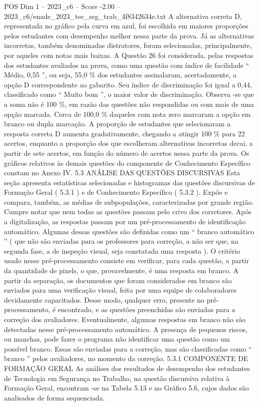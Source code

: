 \begin{textsample}{POS Dim 1 – 2023\_c6 – Score -2.00 – 2023\_c6/enade\_2023\_tec\_seg\_trab\_4f8342634e.txt}
A alternativa correta D, representada no gráfico pela curva em azul, foi escolhida em maiores proporções pelos estudantes com desempenho melhor nessa parte da prova.
Já as alternativas incorretas, também denominadas distratores, foram selecionadas, principalmente, por aqueles com notas mais baixas.
A Questão 26 foi considerada, pelas respostas dos estudantes avaliados na prova, como uma questão com índice de facilidade “ Médio, 0,55 ”, ou seja, 55,0 \% dos estudantes assinalaram, acertadamente, a opção D correspondente ao gabarito.
Seu índice de discriminação foi igual a 0,44, classificado como “ Muito bom ”, o maior valor de discriminação.
Observa -se que a soma não é 100 \%, em razão das questões não respondidas ou com mais de uma opção marcada.
Cerca de 100,0 \% daqueles com nota zero marcaram a opção em branco ou dupla marcação.
A proporção de estudantes que selecionaram a resposta correta D aumenta gradativamente, chegando a atingir 100 \% para 22 acertos, enquanto a proporção dos que escolheram alternativas incorretas decai, a partir de sete acertos, em função do número de acertos nessa parte da prova.
Os gráficos relativos às demais questões do componente de Conhecimento Específico constam no Anexo IV. 5.3 ANÁLISE DAS QUESTÕES DISCURSIVAS Esta seção apresenta estatísticas selecionadas e histogramas das questões discursivas de Formação Geral ( 5.3.1 ) e de Conhecimento Específico ( 5.3.2 ).
Expõe e compara, também, as médias de subpopulações, caracterizadas por grande região.
Cumpre notar que nem todas as questões passam pelo crivo dos corretores.
Após a digitalização, as respostas passam por um pré-processamento de identificação automático.
Algumas dessas questões são definidas como um “ branco automático ” ( que não são enviadas para os professores para correção, a não ser que, na segunda fase, a de inspeção visual, seja constatada uma resposta ).
O critério usado nesse pré-processamento consiste em verificar, para cada questão, a partir da quantidade de pixels, o que, provavelmente, é uma resposta em branco.
A partir da separação, os documentos que foram considerados em branco são enviados para uma verificação visual, feita por uma equipe de colaboradores devidamente capacitados.
Desse modo, qualquer erro, presente no pré-processamento, é encontrado, e as questões preenchidas são enviadas para a correção dos avaliadores.
Eventualmente, algumas respostas em branco não são detectadas nesse pré-processamento automático.
A presença de pequenos riscos, ou manchas, pode fazer o programa não identificar uma questão como um possível branco.
Essas são enviadas para a correção, mas são classificadas como “ branco ” pelos avaliadores, no momento da correção. 5.3.1 COMPONENTE DE FORMAÇÃO GERAL As análises dos resultados de desempenho dos estudantes de Tecnologia em Segurança no Trabalho, na questão discursiva relativa à Formação Geral, encontram -se na Tabela 5.13 e no Gráfico 5.6, cujos dados são analisados de forma sequenciada.

\end{textsample}
